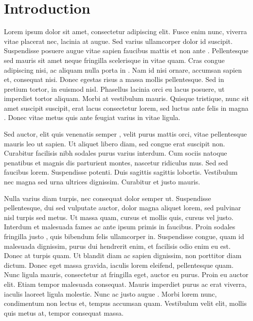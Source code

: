 \chapter{Introduction}
\label{chp:intro}

Lorem ipsum dolor sit amet, consectetur adipiscing elit. Fusce enim nunc,
viverra vitae placerat nec, lacinia at augue.  Sed varius ullamcorper dolor
id suscipit.  Suspendisse posuere augue vitae sapien faucibus mattis et non
ante \cite{Bahr2011}.  Pellentesque sed mauris sit amet neque fringilla
scelerisque in vitae quam.  Cras congue adipiscing nisi, ac aliquam nulla
porta in \cite{Witte92}.  Nam id nisi ornare, accumsan sapien et, consequat
nisi.  Donec egestas risus a massa mollis pellentesque.  Sed in pretium
tortor, in euismod nisl.  Phasellus lacinia orci eu lacus posuere, ut
imperdiet tortor aliquam.  Morbi at vestibulum mauris.  Quisque tristique,
nunc sit amet suscipit suscipit, erat lacus consectetur lorem, sed luctus
ante felis in magna \cite{Morgan2002}.  Donec vitae metus quis ante feugiat varius in vitae
ligula.



Sed auctor, elit quis venenatis semper \cite{Anderson2005}, velit purus
mattis orci, vitae pellentesque mauris leo ut sapien.  Ut aliquet libero
diam, sed congue erat suscipit non.  Curabitur facilisis nibh sodales purus
varius interdum.  Cum sociis natoque penatibus et magnis dis parturient
montes, nascetur ridiculus mus.  Sed sed faucibus lorem.  Suspendisse
potenti.  Duis sagittis sagittis lobortis.  Vestibulum nec magna sed urna
ultrices dignissim.  Curabitur et justo mauris.

Nulla varius diam turpis, nec consequat dolor semper ut. Suspendisse
pellentesque, dui sed vulputate auctor, dolor magna aliquet lorem, sed
pulvinar nisl turpis sed metus. Ut massa quam, cursus et mollis quis, cursus
vel justo. Interdum et malesuada fames ac ante ipsum primis in faucibus.
Proin sodales fringilla justo \cite{Morgan2002}, quis bibendum felis ullamcorper in.
Suspendisse congue, quam id malesuada dignissim, purus dui hendrerit enim,
et facilisis odio enim eu est. Donec at turpis quam. Ut blandit diam ac
sapien dignissim, non porttitor diam dictum. Donec eget massa gravida,
iaculis lorem eleifend, pellentesque quam. Nunc ligula mauris, consectetur
at fringilla eget, auctor eu purus. Proin eu auctor elit. Etiam tempor
malesuada consequat. Mauris imperdiet purus ac erat viverra, iaculis laoreet
ligula molestie. Nunc ac justo augue \cite{Morgan2002}. Morbi lorem nunc, condimentum non
lectus et, tempus accumsan quam. Vestibulum velit elit, mollis quis metus
at, tempor consequat massa.

